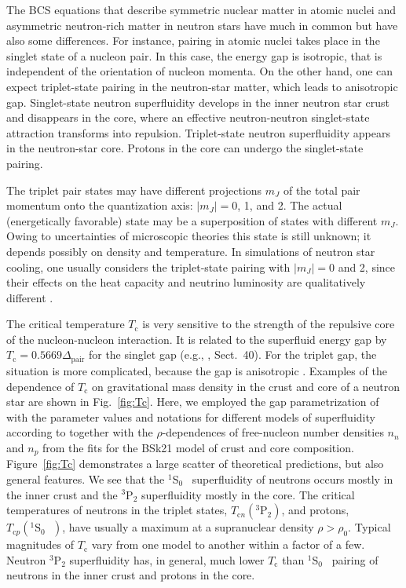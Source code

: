 \documentclass[smallextended]{svjour3}       %
\newcommand{\singlet}{\mbox{$^1$S$_0$ }}
\newcommand{\Tc}{T_\mathrm{c}}
\newcommand{\Tcn}{T_{\mathrm{c}n}}
\newcommand{\Tcp}{T_{\mathrm{c}p}}
\newcommand{\triplet}{\mbox{$^3$P$_2$}}
\begin{document}
The BCS equations that describe symmetric nuclear matter in
atomic nuclei and asymmetric neutron-rich
matter in neutron stars have much in common but have also some differences.
For instance, pairing in atomic nuclei takes place in the
singlet state of a nucleon pair. In this case, the energy
gap is isotropic, that is independent of the orientation of
nucleon momenta. On the other hand, one can expect
triplet-state pairing in the neutron-star matter, which
leads to anisotropic gap. Singlet-state neutron
superfluidity develops in the inner neutron star crust and
disappears in the core, where an effective neutron-neutron
singlet-state attraction transforms into repulsion.
Triplet-state neutron superfluidity appears in the
neutron-star core. Protons in the core can undergo the
singlet-state pairing.

The triplet pair states may have different projections $m_J$
of the total pair momentum onto the quantization axis:
$|m_J| = 0$, 1, and 2. The actual (energetically favorable)
state may be a superposition of states with different
$m_J$.  Owing to uncertainties of microscopic theories this
state is still unknown; it depends possibly on density and
temperature. In simulations of neutron star cooling, one
usually considers the triplet-state pairing with $|m_J| = 0$
and 2, since their effects on the heat capacity and neutrino
luminosity are qualitatively different
\citep[e.g.,][]{YLS99,YKGH01}.

The critical temperature $\Tc$ is very sensitive to the
strength of the repulsive core of the nucleon-nucleon
interaction. It is related to the superfluid energy gap by
$\Tc = 0.5669\Delta_\mathrm{pair}$ for the singlet gap
(e.g., \citealp{LaLi-SP2}, Sect.~40). For the triplet gap,
the situation is more complicated, because the gap is
anisotropic \citep[e.g.,][]{AmundsenOstgaard85b,Baldo-ea92,YLS99}. Examples of the
dependence of $\Tc$ on gravitational mass density in the
crust and core of a neutron star are shown in
Fig.~\ref{fig:Tc}. Here, we employed the gap parametrization
of \citet{KaminkerHY01} with the parameter values and
notations for different models of superfluidity according to
\citet{Ho-ea15} together with the $\rho$-dependences of
free-nucleon number densities $n_n$ and $n_p$ from the fits
\citep{Potekhin-ea13} for the BSk21 model of crust and core
composition. Figure~\ref{fig:Tc} demonstrates a large
scatter of theoretical predictions, but also general
features. We see that the \singlet{} superfluidity of
neutrons occurs mostly in the inner crust and the \triplet{}
superfluidity mostly in the core.  The critical temperatures
of neutrons in the triplet states, $\Tcn(\triplet)$, and
protons, $\Tcp(\singlet)$, have usually a maximum at a
supranuclear density $\rho>\rho_0$. Typical magnitudes of
$\Tc$ vary from one model to another within a factor of a
few.  Neutron \triplet{} superfluidity has, in general, much
lower $\Tc$ than \singlet{} pairing of neutrons in the inner
crust and protons in the core.
\end{document}
